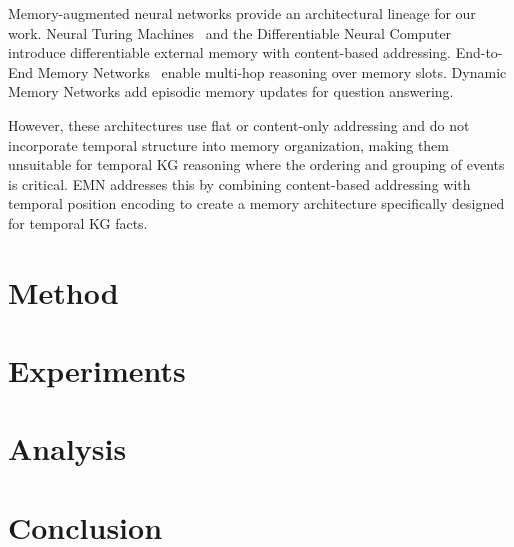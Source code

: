 \documentclass{article}
\begin{document}
Memory-augmented neural networks provide an architectural lineage for our work. Neural Turing Machines~\citep{graves2014ntm} and the Differentiable Neural Computer~\citep{graves2016dnc} introduce differentiable external memory with content-based addressing. End-to-End Memory Networks~\citep{sukhbaatar2015memnn} enable multi-hop reasoning over memory slots. Dynamic Memory Networks add episodic memory updates for question answering.

However, these architectures use flat or content-only addressing and do not incorporate temporal structure into memory organization, making them unsuitable for temporal KG reasoning where the ordering and grouping of events is critical. EMN addresses this by combining content-based addressing with temporal position encoding to create a memory architecture specifically designed for temporal KG facts.

\section{Method}
\label{sec:method}


\section{Experiments}
\label{sec:experiments}


\section{Analysis}
\label{sec:analysis}


\section{Conclusion}
\label{sec:conclusion}


\clearpage



\end{document}
